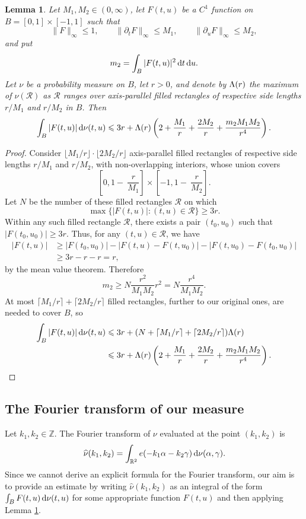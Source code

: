 \documentclass[12pt, reqno]{amsart}
\newtheorem{lemma}[thm]{Lemma}
\theoremstyle{definition}
\theoremstyle{remark}
\numberwithin{equation}{section}
\def\alp{{\alpha}} \def\bfalp{{\boldsymbol \alpha}}
\def\gam{{\gamma}} \def\Gam{{\Gamma}}
\def\le{\leqslant} \def\ge{\geqslant}
\def\d{{\,{\rm d}}}
\def \bR {\mathbb R}
\def \cR {\mathcal R}
\begin{document}
\begin{lemma} \label{ComparisonLemma}
Let $M_1, M_2 \in (0,\infty)$, let $F(t,u)$ be a $C^1$ function on $B = [0,1] \times [-1,1]$ such that
\[
\| F \|_\infty \le 1,
\qquad 
\| \partial_t F\|_\infty \le M_1, 
\qquad
\| \partial_u F \|_\infty \le M_2,
\]
and put
\[
m_2 = \int_B |F(t,u)|^2 \d t \d u.
\]
Let $\nu$ be a probability measure on $B$, let $r > 0$, and denote by ${\Lambda}(r)$ the maximum of $\nu(\cR)$ as $\cR$ ranges over axis-parallel filled rectangles of respective side lengths $r/M_1$ and $r/M_2$ in $B$. Then
\[
\int_B |F(t,u)| \d \nu(t,u) \le 
3r + \Lam(r) \left(2 + \frac{M_1}r + \frac{2M_2}r + \frac{m_2 M_1 M_2}{r^4} \right).
\]
\end{lemma}

\begin{proof} Consider $\lfloor M_1/r \rfloor \cdot \lfloor 2 M_2/r \rfloor$ axis-parallel filled rectangles of respective side lengths $r/M_1$ and $r/M_2$, with non-overlapping interiors, whose union covers
\[
\left[0, 1 - \: \frac{r}{M_1}
\right] \times
\left[-1, 1 - \: \frac{r}{M_2}
\right].
\]
Let $N$ be the number of these filled rectangles $\cR$ on which
\[
\max \{ |F(t,u)|: (t,u) \in \cR \} \ge 3r.
\]
Within any such filled rectangle $\cR$, there exists a pair $(t_0,u_0)$ such that $|F(t_0,u_0)| \ge 3r$. Thus, for any $(t,u) \in \cR$, we have
\begin{align*}
|F(t,u)| 
&\ge |F(t_0,u_0)| - |F(t,u)-F(t,u_0)| - |F(t,u_0) - F(t_0,u_0)| \\
&\ge 3r - r - r = r,
\end{align*}
by the mean value theorem.
Therefore
\[ 
m_2 \ge N \frac{r^2}{M_1 M_2} r^2 = N \frac{r^4}{M_1M_2}.
\]
At most $\lceil M_1/r \rceil + \lceil 2M_2 / r \rceil$ filled rectangles, further to our original ones, are needed to cover $B$, so
\begin{align*}
\int_B |F(t,u)| \d \nu (t,u) &\le 3r + (N + \lceil M_1/r \rceil + \lceil 2M_2 / r \rceil) \Lam(r) 
\\ &\le 3r + \Lam(r) \left(2 + \frac{M_1}r + \frac{2M_2}r + \frac{m_2 M_1 M_2}{r^4} \right).
\end{align*}
\end{proof}

\subsection{The Fourier transform of 
our measure} Let $k_1, k_2 \in \mathbb{Z}.$ The Fourier transform of $\nu$ evaluated at the point $(k_1, k_2)$ is 
\[ 
\widehat \nu(k_1,k_2) = \int_{\bR^2} e(-k_1 \alp - k_2 \gam) \d \nu(\alp,\gam). \]
Since we cannot derive an explicit formula for the Fourier transform, our aim is to provide an estimate by writing $\widehat{\nu}(k_1,k_2)$ as an integral of the form $\int_B F(t,u)\d \nu(t,u)$ for some appropriate function $F(t,u)$ and then applying Lemma \ref{ComparisonLemma}.
\end{document}
